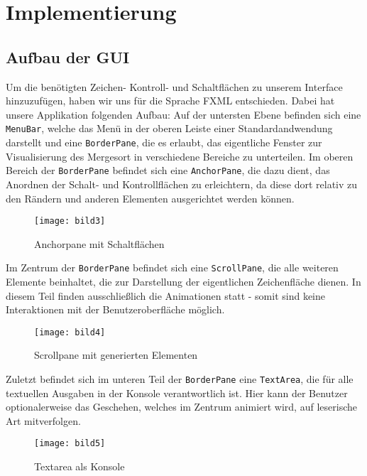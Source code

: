 
\chapter{Implementierung}\label{chap:Implementierung}

\section{Aufbau der GUI}
Um die benötigten Zeichen- Kontroll- und Schaltflächen zu unserem Interface hinzuzufügen, haben wir uns für die Sprache
FXML entschieden. Dabei hat unsere Applikation folgenden Aufbau:
Auf der untersten Ebene befinden sich eine \texttt{MenuBar}, welche das Menü in der oberen Leiste
einer Standardandwendung darstellt und eine \texttt{BorderPane}, die es erlaubt, das eigentliche
Fenster zur Visualisierung des Mergesort in verschiedene Bereiche zu unterteilen. Im oberen Bereich der \texttt{BorderPane}
befindet sich eine \texttt{AnchorPane}, die dazu dient, das Anordnen der Schalt- und Kontrollflächen zu erleichtern, da diese dort
relativ zu den Rändern und anderen Elementen ausgerichtet werden können.


\begin{figure}[!htb]
    \centering
      \texttt{[image: bild3]}
    \caption{Anchorpane mit Schaltflächen}
\end{figure}

Im Zentrum der \texttt{BorderPane} befindet sich eine \texttt{ScrollPane}, die alle weiteren Elemente beinhaltet,
die zur Darstellung der eigentlichen Zeichenfläche dienen. In diesem Teil finden ausschließlich die Animationen statt - somit sind keine Interaktionen mit der
Benutzeroberfläche möglich.

\begin{figure}[!htb]
    \centering
      \texttt{[image: bild4]}
    \caption{Scrollpane mit generierten Elementen}
\end{figure}

Zuletzt befindet sich im unteren Teil der \texttt{BorderPane} eine \texttt{TextArea}, die für alle textuellen Ausgaben in der Konsole
verantwortlich ist. Hier kann der Benutzer optionalerweise das Geschehen, welches im Zentrum animiert wird,
auf leserische Art mitverfolgen.

\begin{figure}[!htb]
    \centering
      \texttt{[image: bild5]}
    \caption{Textarea als Konsole}
\end{figure}

